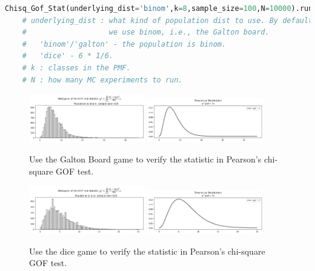 \documentclass[11pt, letterpaper]{article}
\begin{document}
\lstset{
    basicstyle=\footnotesize,
    xleftmargin=-1em,aboveskip=0.5em,belowskip=0.5em
}
\begin{lstlisting}[language=python]
    Chisq_Gof_Stat(underlying_dist='binom',k=8,sample_size=100,N=10000).run()
    # underlying_dist : what kind of population dist to use. By default, 
    #                   we use binom, i.e., the Galton board.
    #   'binom'/'galton' - the population is binom.
    #   'dice' - 6 * 1/6.
    # k : classes in the PMF.
    # N : how many MC experiments to run.
    \end{lstlisting}

\begin{figure}[htbp]
    \centering
    \includegraphics[width=0.45\textwidth]{fig8-galton gof1.png}
    \includegraphics[width=0.45\textwidth]{fig8-galton gof2.png}
    \caption{Use the Galton Board game to verify the statistic in Pearson's chi-square GOF test.}
    \label{fig:galton gof}
\end{figure}

\begin{figure}[htbp]
    \centering
    \includegraphics[width=0.45\textwidth]{fig9-dice gof1.png}
    \includegraphics[width=0.45\textwidth]{fig9-dice gof2.png}
    \caption{Use the dice game to verify the statistic in Pearson's chi-square GOF test.}
    \label{fig:dice gof}
\end{figure}
\end{document}
